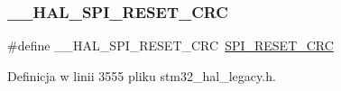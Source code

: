 \subsubsection{\texorpdfstring{\+\_\+\+\_\+\+H\+A\+L\+\_\+\+S\+P\+I\+\_\+\+R\+E\+S\+E\+T\+\_\+\+C\+RC}{\_\_HAL\_SPI\_RESET\_CRC}}
{\footnotesize\ttfamily \#define \+\_\+\+\_\+\+H\+A\+L\+\_\+\+S\+P\+I\+\_\+\+R\+E\+S\+E\+T\+\_\+\+C\+RC~\hyperlink{group___s_p_i___private___macros_gab120a0085b72939e7d19c4f6b3381a99}{S\+P\+I\+\_\+\+R\+E\+S\+E\+T\+\_\+\+C\+RC}}



Definicja w linii 3555 pliku stm32\+\_\+hal\+\_\+legacy.\+h.

